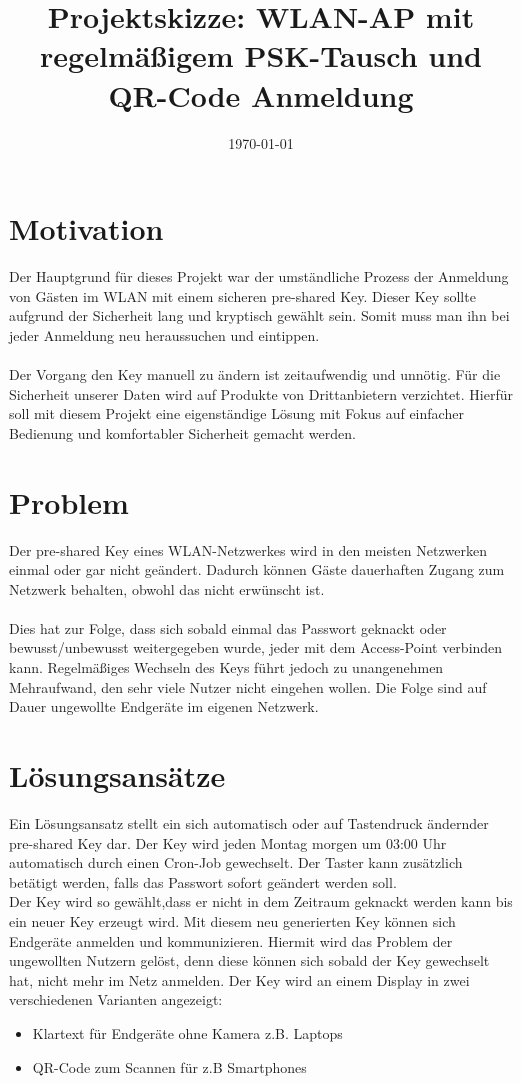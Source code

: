 \documentclass[a4paper,11pt,singlespacing]{article}
\title{Projektskizze: WLAN-AP mit regelmäßigem PSK-Tausch und QR-Code Anmeldung}
\date{\today}
\begin{document}
	\setlength{\parindent}{0ex}
	\maketitle
	
	\section{Motivation}
	Der Hauptgrund für dieses Projekt war der umständliche Prozess der Anmeldung von Gästen im WLAN mit einem sicheren pre-shared Key. Dieser Key sollte aufgrund der Sicherheit lang und kryptisch gewählt sein. Somit muss man ihn bei jeder Anmeldung neu heraussuchen und eintippen. \\ \\
	Der Vorgang den Key manuell zu ändern ist zeitaufwendig und unnötig. Für die Sicherheit unserer Daten wird auf Produkte von Drittanbietern verzichtet. Hierfür soll mit diesem Projekt eine eigenständige Lösung mit Fokus auf einfacher Bedienung und komfortabler Sicherheit gemacht werden. 
	
	\section{Problem}
	Der pre-shared Key eines WLAN-Netzwerkes wird in den meisten Netzwerken einmal oder gar nicht geändert. Dadurch können Gäste dauerhaften Zugang zum Netzwerk behalten, obwohl das nicht erwünscht ist.  \\ \\ 
	Dies hat zur Folge, dass sich sobald einmal das Passwort geknackt oder bewusst/unbewusst weitergegeben wurde, jeder mit dem Access-Point verbinden kann. Regelmäßiges Wechseln des Keys führt jedoch zu unangenehmen Mehraufwand, den sehr viele Nutzer nicht eingehen wollen. Die Folge sind auf Dauer ungewollte Endgeräte im eigenen Netzwerk.
	
	\section{Lösungsansätze}
	Ein Lösungsansatz stellt ein sich automatisch oder auf Tastendruck ändernder pre-shared Key dar. Der Key wird jeden Montag morgen um 03:00 Uhr automatisch durch einen Cron-Job gewechselt. Der Taster kann zusätzlich betätigt werden, falls das Passwort sofort geändert werden soll. \\ 
	Der Key wird so gewählt,dass er nicht in dem Zeitraum geknackt werden kann bis ein neuer Key erzeugt wird. Mit diesem neu generierten Key können sich Endgeräte anmelden und kommunizieren. Hiermit wird das Problem der ungewollten Nutzern gelöst, denn diese können sich sobald der Key gewechselt hat, nicht mehr im Netz anmelden. Der Key wird an einem Display in zwei verschiedenen Varianten angezeigt:
	\begin{itemize}
		\item Klartext für Endgeräte ohne Kamera z.B. Laptops
		\item QR-Code zum Scannen für z.B Smartphones
	\end{itemize}
\end{document}
